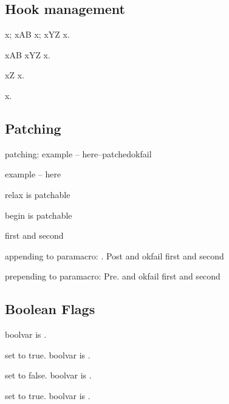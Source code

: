 \documentclass{article}
\begin{document}
\subsection{Hook management}

\newcommand{\mymacro}{x}%
\mymacro;
\appto\mymacro{AB}%
\mymacro;
\appto\mymacro{YZ}%
\mymacro.

\renewcommand{\mymacro}{x}%
\newcommand{\myothermacro}{AB}%
\epreto\mymacro{\myothermacro}%
\renewcommand{\myothermacro}{YZ}%
\eappto\mymacro{\myothermacro}
\mymacro.

\renewcommand{\mymacro}{x}%
\newcommand{\mymacroB}{\mymacroC}%
\newcommand{\mymacroC}{\mymacroD}%
\newcommand{\mymacroD}{Z}%
\eappto\mymacro{\mymacroB}
\mymacro.

\newcommand{\premacro}{x}
\bgroup{}\egroup
\premacro. 

\subsection{Patching}
\def\patchme{example -- here}
patching: \patchcmd\patchme{--}{patched}{ok}{fail}

\patchme 

relax is  patchable

begin is  patchable

\def\paramacro#1#2{#1 and #2}
\paramacro{first}{second}

appending to paramacro: \apptocmd\paramacro{. Post}{ok}{fail}\newline
\paramacro{first}{second}

prepending to paramacro: \pretocmd\paramacro{Pre. }{ok}{fail}\newline
\paramacro{first}{second}

\subsection{Boolean Flags}

boolvar is .

set to true. boolvar is .

set to false. boolvar is .

set to true. boolvar is .
\end{document}

